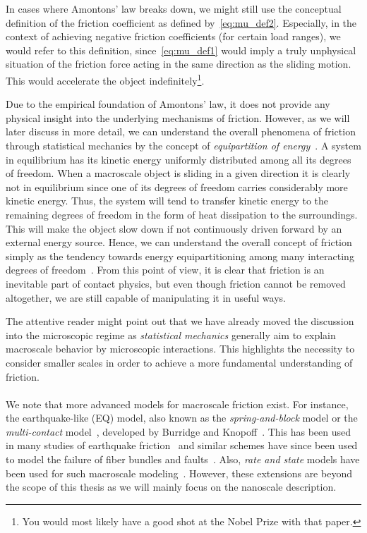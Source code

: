In cases where Amontons' law breaks down, we might still use the conceptual
definition of the friction coefficient as defined by~\cref{eq:mu_def2}.
Especially, in the context of achieving negative friction coefficients (for certain load ranges), we would refer to this definition, since~\cref{eq:mu_def1}
would imply a truly unphysical situation of the friction force acting in the
same direction as the sliding motion. This would accelerate the object
indefinitely\footnote{You would most likely have a good shot at the Nobel Prize
with that paper.}.

Due to the empirical foundation of Amontons’ law, it does not provide any
physical insight into the underlying mechanisms of friction. However, as we will
later discuss in more detail, we can understand the overall phenomena of
friction through statistical mechanics by the concept of \textit{equipartition
of energy}~\cite{Manini_2016}. A system in equilibrium has its kinetic energy
uniformly distributed among all its degrees of freedom. When a macroscale object
is sliding in a given direction it is clearly not in equilibrium since one of
its degrees of freedom carries considerably more kinetic energy. Thus, the
system will tend to transfer kinetic energy to the remaining
degrees of freedom in the form of heat dissipation to the surroundings. This will make the object slow down if not continuously driven forward by an external energy source. Hence, we can understand the overall concept of friction simply
as the tendency towards energy equipartitioning among many
interacting degrees of freedom~\cite{Manini_2016}. From this point of view, it is
clear that friction is an inevitable part of contact physics, but even though
friction cannot be removed altogether, we are still capable of manipulating it
in useful ways. 

The attentive reader might point out that we have already moved the discussion
into the microscopic regime as \textit{statistical mechanics} generally
aim to explain macroscale behavior by microscopic interactions. This 
highlights the necessity to consider smaller scales in order to achieve a more fundamental understanding of friction.
\\
\\
We note that more advanced models for macroscale friction exist. For instance, the earthquake-like (EQ) model, also known as the \textit{spring-and-block} model or the \textit{multi-contact} model~\cite{Manini_2016}, developed by Burridge and Knopoff~\cite{Burridge_1967}. This has been used in many studies of earthquake friction~\cite{PhysRevLett.88.096102} and similar schemes have since been used to model the failure of fiber bundles and faults~\cite{newman_failure_1991, Smalley_1985}. Also, \textit{rate and state} models have been used for such macroscale modeling~\cite{SELVADURAI2023229689}. However, these extensions are beyond the scope of this thesis as we will mainly focus on the nanoscale description. 




